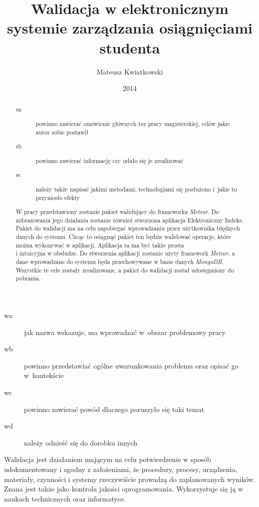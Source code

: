 \documentclass[brudnopis]{xmgr}
\author   {Mateusz Kwiatkowski}
\title    {Walidacja w elektronicznym systemie zarządzania osiągnięciami studenta}
\date     {2014}
\begin{document}
\begin{abstract}

\begin{description}
\item[sa] \textcolor{sa}{powinno zawierać omówienie głównych 
tez pracy magisterskiej, celów jakie autor sobie postawił} 
\item[sb] \textcolor{sb}{powinno zawierać informację czy udało 
  się je zrealizować}
\item[sc] \textcolor{sc}{należy także napisać jakimi metodami,
  technologiami się posłużono i~jakie to przyniosło efekty}
\end{description}

\textcolor{sa}{W pracy przedstawiony zostanie pakiet walidujący do frameworka \textit{Meteor}. Do zobrazowania
jego działania zostanie również stworzona aplikacja Elektroniczny Indeks. Pakiet do walidacji ma na celu zapobiegać
wprowadzaniu przez użytkownika błędnych danych do systemu. Chcąc to osiągnąć pakiet ten będzie
walidować operacje, które można wykonywać w aplikacji. Aplikacja ta ma być także prosta
\\
i intuicyjna w obsłudze.} \textcolor{sc}{Do stworzenia aplikacji zostanie użyty framework \textit{Meteor}, a dane wprowadzane do systemu
będa przechowywane w bazie danych \textit{MongoDB}.} \textcolor{sb}{Wszystkie te cele zostały zrealizowane,
a pakiet do walidacji został udostępniony do pobrania.}

\end{abstract}

\maketitle
%
\introduction

\begin{description}
\item[wa] \textcolor{wa}{jak nazwa wskazuje, ma wprowadzać 
  w~obszar problemowy pracy}
\item[wb] \textcolor{wb}{powinno przedstawiać ogólne 
  uwarunkowania problemu oraz opisać go w~kontekście}
\item[wc] \textcolor{wc}{powinno zawierać powód dlaczego 
  poruszyło się taki temat}
\item[wd] \textcolor{wd}{należy odnieść się do dorobku innych}
\end{description}

\textcolor{wa}{Walidacja jest działaniem mającym na celu potwierdzenie w sposób udokumentowany i zgodny
z założeniami, że procedury, procesy, urządzenia, materiały, czynności i systemy rzeczywiście
prowadzą do zaplanowanych wyników. Znana jest także jako kontrola jakości oprogramowania.
Wykorzystuje się ją w naukach technicznych oraz informatyce.}
\\
\end{document}
